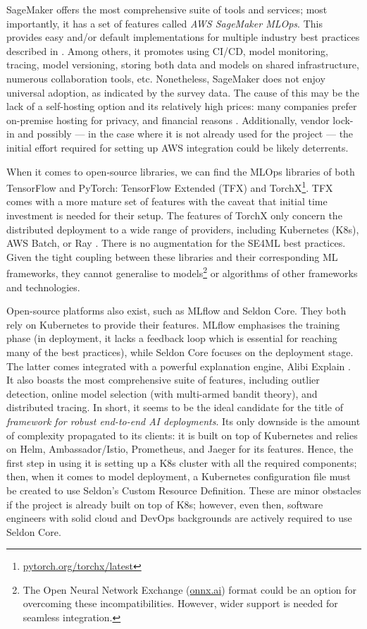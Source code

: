 SageMaker offers the most comprehensive suite of tools and services; most importantly, it has a set of features called \textit{AWS SageMaker MLOps}. This provides easy and/or default implementations for multiple industry best practices described in \cite{serban2020adoption,serban2021practices,john2020ai}. Among others, it promotes using CI/CD, model monitoring, tracing, model versioning, storing both data and models on shared infrastructure, numerous collaboration tools, etc. Nonetheless, SageMaker does not enjoy universal adoption, as indicated by the survey data. The cause of this may be the lack of a self-hosting option and its relatively high prices: many companies prefer on-premise hosting for privacy, and financial reasons \cite{bosch2021engineering}. Additionally, vendor lock-in and possibly --- in the case where it is not already used for the project --- the initial effort required for setting up AWS integration could be likely deterrents.

When it comes to open-source libraries, we can find the MLOps libraries of both TensorFlow and PyTorch: TensorFlow Extended (TFX) \cite{baylor2017tfx} and TorchX\footnote{\href{https://pytorch.org/torchx/latest/}{pytorch.org/torchx/latest}}. TFX comes with a more mature set of features with the caveat that initial time investment is needed for their setup. The features of TorchX only concern the distributed deployment to a wide range of providers, including Kubernetes (K8s), AWS Batch, or Ray \cite{moritz2018ray}. There is no augmentation for the SE4ML best practices. Given the tight coupling between these libraries and their corresponding ML frameworks, they cannot generalise to models\footnote{The Open Neural Network Exchange (\href{https://onnx.ai/}{onnx.ai}) format could be an option for overcoming these incompatibilities. However, wider support is needed for seamless integration.} or algorithms of other frameworks and technologies. 

Open-source platforms also exist, such as MLflow and Seldon Core. They both rely on Kubernetes to provide their features. MLflow emphasises the training phase (in deployment, it lacks a feedback loop which is essential for reaching many of the best practices), while Seldon Core focuses on the deployment stage. The latter comes integrated with a powerful explanation engine, Alibi Explain \cite{klaise2021alibi}. It also boasts the most comprehensive suite of features, including outlier detection, online model selection (with multi-armed bandit theory), and distributed tracing. In short, it seems to be the ideal candidate for the title of \textit{framework for robust end-to-end AI deployments}. Its only downside is the amount of complexity propagated to its clients: it is built on top of Kubernetes and relies on Helm, Ambassador/Istio, Prometheus, and Jaeger for its features. Hence, the first step in using it is setting up a K8s cluster with all the required components; then, when it comes to model deployment, a Kubernetes configuration file must be created to use Seldon's Custom Resource Definition. These are minor obstacles if the project is already built on top of K8s; however, even then, software engineers with solid cloud and DevOps backgrounds are actively required to use Seldon Core.

